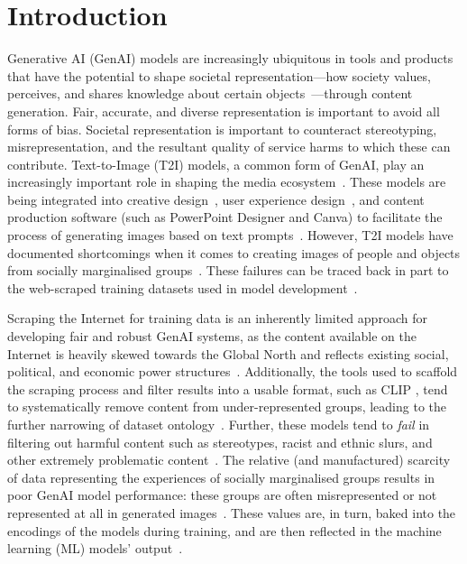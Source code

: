\section{Introduction}\label{introduction}

Generative AI (GenAI) models are increasingly ubiquitous in tools and products that have the potential to shape societal representation---how society values, perceives, and shares knowledge about certain objects~\cite{gillespie2024generative,luccioni2023stablebiasanalyzingsocietal}---through content generation. Fair, accurate, and diverse representation is important to avoid all forms of bias. Societal representation is important to counteract stereotyping, misrepresentation, and the resultant quality of service harms to which these can contribute. Text-to-Image (T2I) models, a common form of GenAI, play an increasingly important role in shaping the media ecosystem~\cite{Mim2024images,qadri2024}. These models are being integrated into creative design~\cite{nouraei2024creativedesign, kalving2024aidesign}, user experience design~\cite{li2024UXD}, and content production software (such as PowerPoint Designer and Canva) to facilitate the process of generating images based on text prompts~\cite{MicrosoftImagePromptsDallE, CanvaLeonardoAI}. However, T2I models have documented shortcomings when it comes to creating images of people and objects from socially marginalised groups~\cite{Mim2024images,qadri2024}. These failures can be traced back in part to the web-scraped training datasets used in model development~\cite{birhane2021large,schuhmann2022laion}. 

 Scraping the Internet for training data is an inherently limited approach for developing fair and robust GenAI systems, as the content available on the Internet is heavily skewed towards the Global North and reflects existing social, political, and economic power structures~\cite{luccioni2024stable_bias,hongevaldatarace23}.  Additionally, the tools used to scaffold the scraping process and filter results into a usable format, such as CLIP \cite{radford2021learning}, tend to systematically remove content from under-represented groups, leading to the further narrowing of dataset ontology~\cite{hong2024s}. Further, these models tend to \textit{fail} in filtering out harmful content such as stereotypes, racist and ethnic slurs, and other extremely problematic content~\cite{birhane2021misogyny}. The relative (and manufactured) scarcity of data representing the experiences of socially marginalised groups results in poor GenAI model performance: these groups are often misrepresented or not represented at all in generated images~\cite{mack2024they,qadri2024,dasProvenanceAberrationsImage2024}. These values are, in turn, baked into the encodings of the models during training, and are then reflected in the machine learning (ML) models' output~\cite{birhane2022values}. 
 
